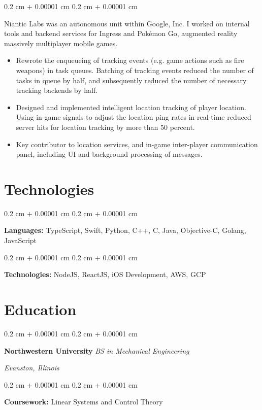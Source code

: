 \documentclass[12pt, letterpaper]{article}
\newenvironment{highlights}{
    \begin{itemize}[
        topsep=0.10 cm,
        parsep=0.10 cm,
        partopsep=0pt,
        itemsep=0pt,
        leftmargin=0.4 cm + 10pt
    ]
}{
    \end{itemize}
} %
\newenvironment{onecolentry}{
    \begin{adjustwidth}{
        0.2 cm + 0.00001 cm
    }{
        0.2 cm + 0.00001 cm
    }
}{
    \end{adjustwidth}
} %
\newenvironment{twocolentry}[2][]{
    \onecolentry
    \def\secondColumn{#2}
    \setcolumnwidth{\fill, 4.5 cm}
    \begin{paracol}{2}
}{
    \switchcolumn \raggedleft \secondColumn
    \end{paracol}
    \endonecolentry
} %
\begin{document}
        \vspace{0.10 cm}

        \begin{onecolentry}
            Niantic Labs was an autonomous unit within Google, Inc.  I worked on internal tools and backend services for Ingress and Pokémon Go, augmented reality massively multiplayer mobile games.
            \begin{highlights}
                \item Rewrote the enqueueing of tracking events (e.g. game actions such as fire weapons) in task queues.  Batching of tracking events reduced the number of tasks in queue by half, and subsequently reduced the number of necessary tracking backends by half.
                \item Designed and implemented intelligent location tracking of player location.  Using in-game signals to adjust the location ping rates in real-time reduced server hits for location tracking by more than 50 percent.
                \item Key contributor to location services, and in-game inter-player communication panel, including UI and background processing of messages.
            \end{highlights}
        \end{onecolentry}

    \section{Technologies}
        \begin{onecolentry}
            \textbf{Languages:} TypeScript, Swift, Python, C++, C, Java, Objective-C, Golang, JavaScript
        \end{onecolentry}

        \vspace{0.2 cm}

        \begin{onecolentry}
            \textbf{Technologies:} NodeJS, ReactJS, iOS Development, AWS, GCP
        \end{onecolentry}

    \section{Education}
        \begin{twocolentry}{
        \textit{Evanston, Illinois}}
            \textbf{Northwestern University}
            \textit{BS in Mechanical Engineering}
        \end{twocolentry}

        \vspace{0.10 cm}
        \begin{onecolentry}
                \textbf{Coursework:} Linear Systems and Control Theory
        \end{onecolentry}
\end{document}
